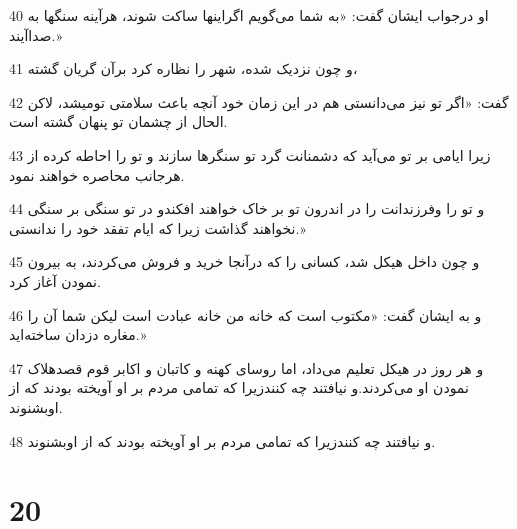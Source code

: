 \par 40 او درجواب ایشان گفت: «به شما می‌گویم اگراینها ساکت شوند، هرآینه سنگها به صداآیند.»
\par 41 و چون نزدیک شده، شهر را نظاره کرد برآن گریان گشته،
\par 42 گفت: «اگر تو نیز می‌دانستی هم در این زمان خود آنچه باعث سلامتی تومیشد، لاکن الحال از چشمان تو پنهان گشته است.
\par 43 زیرا ایامی بر تو می‌آید که دشمنانت گرد تو سنگرها سازند و تو را احاطه کرده از هرجانب محاصره خواهند نمود.
\par 44 و تو را وفرزندانت را در اندرون تو بر خاک خواهند افکندو در تو سنگی بر سنگی نخواهند گذاشت زیرا که ایام تفقد خود را ندانستی.»
\par 45 و چون داخل هیکل شد، کسانی را که درآنجا خرید و فروش می‌کردند، به بیرون نمودن آغاز کرد.
\par 46 و به ایشان گفت: «مکتوب است که خانه من خانه عبادت است لیکن شما آن را مغاره دزدان ساخته‌اید.»
\par 47 و هر روز در هیکل تعلیم می‌داد، اما روسای کهنه و کاتبان و اکابر قوم قصدهلاک نمودن او می‌کردند.و نیافتند چه کنندزیرا که تمامی مردم بر او آویخته بودند که از اوبشنوند.
\par 48 و نیافتند چه کنندزیرا که تمامی مردم بر او آویخته بودند که از اوبشنوند.

\chapter{20}

